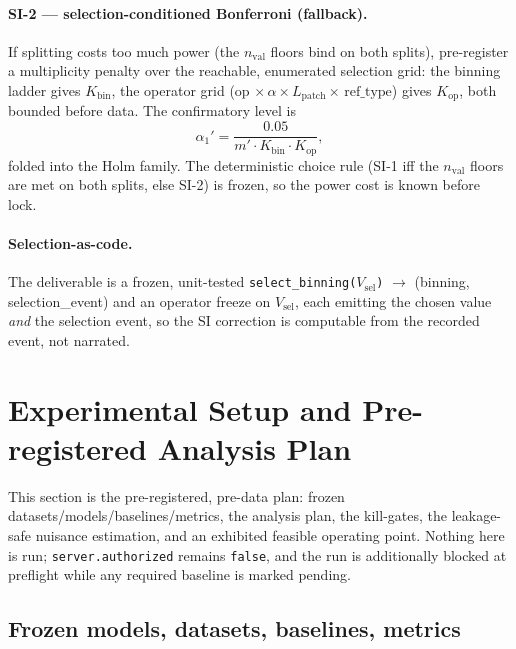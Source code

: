 \documentclass[11pt]{article}
\theoremstyle{plain}
\theoremstyle{definition}
\begin{document}
\paragraph{SI-2 --- selection-conditioned Bonferroni (fallback).} If splitting costs
too much power (the $n_{\mathrm{val}}$ floors bind on both splits), pre-register a
multiplicity penalty over the reachable, enumerated selection grid: the binning
ladder gives $K_{\mathrm{bin}}$, the operator grid (op $\times\,\alpha\times
L_{\mathrm{patch}}\times\,\mathrm{ref\_type}$) gives $K_{\mathrm{op}}$, both bounded
before data. The confirmatory level is
\begin{equation}
\alpha_1' = \frac{0.05}{m'\cdot K_{\mathrm{bin}}\cdot K_{\mathrm{op}}},
\label{eq:sialpha}
\end{equation}
folded into the Holm family. The deterministic choice rule (SI-1 iff the
$n_{\mathrm{val}}$ floors are met on both splits, else SI-2) is frozen, so the power
cost is known before lock.

\paragraph{Selection-as-code.} The deliverable is a frozen, unit-tested
\texttt{select\_binning($V_{\mathrm{sel}}$)} $\to$ (binning, selection\_event) and an
operator freeze on $V_{\mathrm{sel}}$, each emitting the chosen value \emph{and} the
selection event, so the SI correction is computable from the recorded event, not
narrated.

\section{Experimental Setup and Pre-registered Analysis Plan}\label{sec:setup}

This section is the pre-registered, pre-data plan: frozen
datasets/models/baselines/metrics, the analysis plan, the kill-gates, the
leakage-safe nuisance estimation, and an exhibited feasible operating point.
Nothing here is run; \texttt{server.authorized} remains \texttt{false}, and the run
is additionally blocked at preflight while any required baseline is marked pending.

\subsection{Frozen models, datasets, baselines, metrics}\label{sec:setup:frozen}
\end{document}

